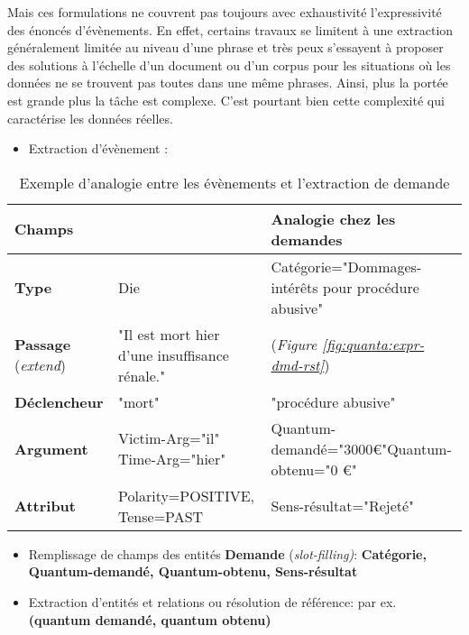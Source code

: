 Mais ces formulations ne couvrent pas toujours avec exhaustivité l'expressivité des énoncés d'évènements. En effet, certains travaux se limitent à une extraction généralement limitée au niveau d'une phrase et très peux s'essayent à proposer des solutions à l'échelle d'un document ou d'un corpus pour les situations où les données ne se trouvent pas toutes dans une même phrases. Ainsi, plus la portée est grande plus la tâche est complexe. C'est pourtant bien cette complexité qui caractérise les données réelles. 
\begin{itemize}
\item Extraction d'évènement : 
\end{itemize}
\begin{table}[h]
\small
\begin{tabular}{|p{}|p{}|p{}|}
\hline
\textbf{Champs} & \textbf{\cite{ace2005event}} & \textbf{Analogie chez les demandes} \\ \hline
\textbf{Type} &  Die & Catégorie="Dommages-intérêts pour procédure abusive" \\ \hline
\textbf{Passage} (\textit{extend}) & "Il est mort hier d'une insuffisance rénale."  & (\textit{Figure \ref{fig:quanta:expr-dmd-rst}}) \\ \hline
\textbf{Déclencheur} & "mort" & "procédure abusive"\\ \hline
\textbf{Argument} & Victim-Arg="il" \linebreak Time-Arg="hier"  & Quantum-demandé="3000\euro{}"\linebreak  Quantum-obtenu="0 \euro{}"\ \\ \hline
\textbf{Attribut} & Polarity=POSITIVE, Tense=PAST & Sens-résultat="Rejeté" \\ \hline
\end{tabular}
\caption{Exemple d'analogie entre les évènements et l'extraction de demande} \label{tab:quanta:analogieevt}
\end{table}
\begin{itemize}
\item Remplissage de champs des entités \textbf{Demande} (\textit{slot-filling)}: \textbf{Catégorie, Quantum-demandé, Quantum-obtenu, Sens-résultat}
\item Extraction d'entités et relations ou résolution de référence: par ex. \textbf{(quantum demandé, quantum obtenu)}
\end{itemize}

